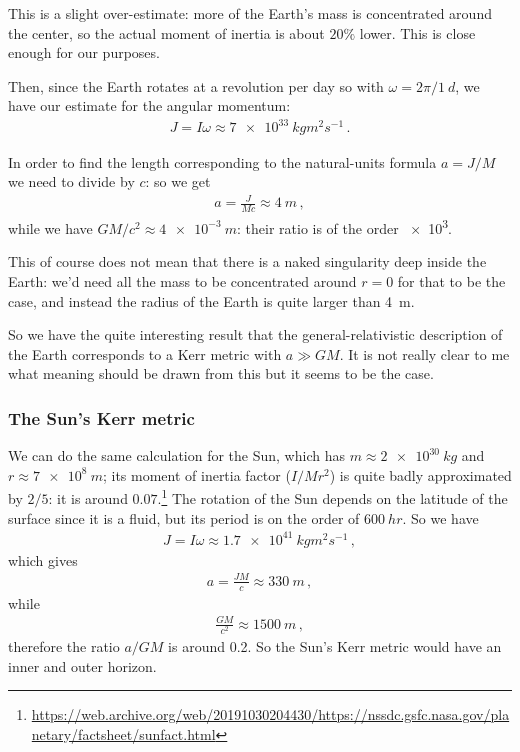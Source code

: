 \documentclass[main.tex]{subfiles}
\begin{document}
This is a slight over-estimate: more of the Earth's mass is concentrated around the center, so the actual moment of inertia is about \(20\%\) lower. This is close enough for our purposes. 

Then, since the Earth rotates at a revolution per day so with \(\omega = 2\pi / \SI{1}{d}\), we have our estimate for the angular momentum: 
%
\begin{align}
  J = I \omega 
  \approx \SI{7e+33}{kg m^2 s^{-1}}
\,.
\end{align}

In order to find the length corresponding to the natural-units formula \(a = J/M\) we need to divide by \(c\): so we get 
%
\begin{align}
  a = \frac{J}{Mc} \approx \SI{4}{m}
\,,
\end{align}
%
while we have \(GM/c^2 \approx \SI{4e-3}{m}\): their ratio is of the order \num{e3}.

This of course does not mean that there is a naked singularity deep inside the Earth: we'd need all the mass to be concentrated around \(r=0\) for that to be the case, and instead the radius of the Earth is quite larger than \SI{4}{m}.

So we have the quite interesting result that the general-relativistic description of the Earth corresponds to a Kerr metric with \(a \gg GM\). It is not really clear to me what meaning should be drawn from this but it seems to be the case. 

\subsubsection{The Sun's Kerr metric}

We can do the same calculation for the Sun, which has \(m \approx \SI{2e30}{kg}\) and \(r \approx \SI{7e8}{m}\); its moment of inertia factor (\(I  / Mr^2\)) is quite badly approximated by \(2/5\): it is around \(0.07\).\footnote{\url{https://web.archive.org/web/20191030204430/https://nssdc.gsfc.nasa.gov/planetary/factsheet/sunfact.html}}
The rotation of the Sun depends on the latitude of the surface since it is a fluid, but its period is on the order of \(\SI{600}{hr}\). 
So we have 
%
\begin{align}
  J = I \omega \approx \SI{1.7e41}{kg m^2 s^{-1}}
\,,
\end{align}
%
which gives 
%
\begin{align}
  a = \frac{JM}{c} \approx \SI{330}{m}
\,,
\end{align}
%
while 
%
\begin{align}
  \frac{GM}{c^2} \approx \SI{1500}{m}
\,,
\end{align}
%
therefore the ratio \(a/GM\) is around \num{0.2}. 
So the Sun's Kerr metric would have an inner and outer horizon. 
\end{document}
